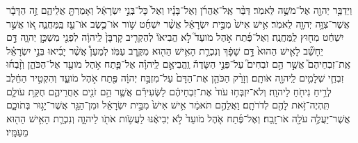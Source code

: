\documentclass{openreader}
\begin{document}
וַיְדַבֵּ֥ר יְהוָ֖ה אֶל־מֹשֶׁ֥ה לֵּאמֹֽר׃ 
דַּבֵּ֨ר אֶֽל־אַהֲרֹ֜ן וְאֶל־בָּנָ֗יו וְאֶל֙ כָּל־בְּנֵ֣י יִשְׂרָאֵ֔ל וְאָמַרְתָּ֖ אֲלֵיהֶ֑ם זֶ֣ה הַדָּבָ֔ר אֲשֶׁר־צִוָּ֥ה יְהוָ֖ה לֵאמֹֽר׃ 
אִ֥ישׁ אִישׁ֙ מִבֵּ֣ית יִשְׂרָאֵ֔ל אֲשֶׁ֨ר יִשְׁחַ֜ט שֹׁ֥ור אֹו־כֶ֛שֶׂב אֹו־עֵ֖ז בַּֽמַּחֲנֶ֑ה אֹ֚ו אֲשֶׁ֣ר יִשְׁחַ֔ט מִח֖וּץ לַֽמַּחֲנֶֽה׃ 
וְאֶל־פֶּ֜תַח אֹ֣הֶל מֹועֵד֮ לֹ֣א הֱבִיאֹו֒ לְהַקְרִ֤יב קָרְבָּן֙ לַֽיהוָ֔ה לִפְנֵ֖י מִשְׁכַּ֣ן יְהוָ֑ה דָּ֣ם יֵחָשֵׁ֞ב לָאִ֤ישׁ הַהוּא֙ דָּ֣ם שָׁפָ֔ךְ וְנִכְרַ֛ת הָאִ֥ישׁ הַה֖וּא מִקֶּ֥רֶב עַמֹּֽו׃ 
לְמַעַן֩ אֲשֶׁ֨ר יָבִ֜יאוּ בְּנֵ֣י יִשְׂרָאֵ֗ל אֶֽת־זִבְחֵיהֶם֮ אֲשֶׁ֣ר הֵ֣ם זֹבְחִים֮ עַל־פְּנֵ֣י הַשָּׂדֶה֒ וֶֽהֱבִיאֻ֣ם לַֽיהוָ֗ה אֶל־פֶּ֛תַח אֹ֥הֶל מֹועֵ֖ד אֶל־הַכֹּהֵ֑ן וְזָ֨בְח֜וּ זִבְחֵ֧י שְׁלָמִ֛ים לַֽיהוָ֖ה אֹותָֽם׃ 
וְזָרַ֨ק הַכֹּהֵ֤ן אֶת־הַדָּם֙ עַל־מִזְבַּ֣ח יְהוָ֔ה פֶּ֖תַח אֹ֣הֶל מֹועֵ֑ד וְהִקְטִ֣יר הַחֵ֔לֶב לְרֵ֥יחַ נִיחֹ֖חַ לַיהוָֽה׃ 
וְלֹא־יִזְבְּח֥וּ עֹוד֙ אֶת־זִבְחֵיהֶ֔ם לַשְּׂעִירִ֕ם אֲשֶׁ֛ר הֵ֥ם זֹנִ֖ים אַחֲרֵיהֶ֑ם חֻקַּ֥ת עֹולָ֛ם תִּֽהְיֶה־זֹּ֥את לָהֶ֖ם לְדֹרֹתָֽם׃ 
וַאֲלֵהֶ֣ם תֹּאמַ֔ר אִ֥ישׁ אִישׁ֙ מִבֵּ֣ית יִשְׂרָאֵ֔ל וּמִן־הַגֵּ֖ר אֲשֶׁר־יָג֣וּר בְּתֹוכָ֑ם אֲשֶׁר־יַעֲלֶ֥ה עֹלָ֖ה אֹו־זָֽבַח׃ 
וְאֶל־פֶּ֜תַח אֹ֤הֶל מֹועֵד֙ לֹ֣א יְבִיאֶ֔נּוּ לַעֲשֹׂ֥ות אֹתֹ֖ו לַיהוָ֑ה וְנִכְרַ֛ת הָאִ֥ישׁ הַה֖וּא מֵעַמָּֽיו׃ 
\end{document}
